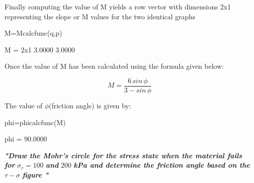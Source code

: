 \documentclass{article}
\begin{document}
\begin{par}
\begin{flushleft}
Finally computing the value of M yields a row vector with dimensions 2x1 representing the slope or M values for the two identical graphs
\end{flushleft}
\end{par}

\begin{matlabcode}
M=Mcalcfunc(q,p)
\end{matlabcode}
\begin{matlaboutput}
M = 2x1    
    3.0000
    3.0000

\end{matlaboutput}

\begin{par}
\begin{flushleft}
Once the value of M has been calculated using the formula given below:
\end{flushleft}
\end{par}

\begin{par}
$$M=\frac{6\,sin\,\phi}{3-sin\,\phi}$$
\end{par}

\begin{par}
\begin{flushleft}
The value of $\phi$(friction angle) is given by:
\end{flushleft}
\end{par}

\begin{matlabcode}
phi=phicalcfunc(M)
\end{matlabcode}
\begin{matlaboutput}
phi = 90.0000
\end{matlaboutput}


\label{H_8EA8D249}

\begin{par}
\begin{flushleft}
\textit{\textbf{"Draw the Mohr’s circle for the stress state when the material fails for }}$\sigma_{r}=100$ \textit{\textbf{and }}$200$\textit{\textbf{ kPa and determine the friction angle based on the }}$\tau-\sigma$ \textit{\textbf{figure " }}
\end{flushleft}
\end{par}
\end{document}
